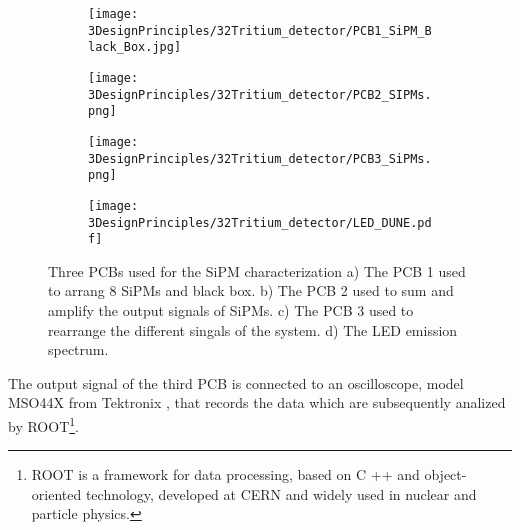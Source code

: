 \begin{figure}
\centering
    \begin{subfigure}[b]{0.5\textwidth}
    \centering
    \texttt{[image: 3DesignPrinciples/32Tritium\_detector/PCB1\_SiPM\_Black\_Box.jpg]}  
    \caption{\label{subfig:PCB1}}
    \end{subfigure}
    \hfill
    \begin{subfigure}[b]{0.45\textwidth}
    \centering
    \texttt{[image: 3DesignPrinciples/32Tritium\_detector/PCB2\_SIPMs.png]}  
    \caption{\label{subfig:PCB2}}
    \end{subfigure}
    \hfill
    \begin{subfigure}[b]{0.4\textwidth}
    \centering
    \texttt{[image: 3DesignPrinciples/32Tritium\_detector/PCB3\_SiPMs.png]}  
    \caption{\label{subfig:PCB3}}
    \end{subfigure}
    \hfill
    \begin{subfigure}[b]{0.5\textwidth}
    \centering
    \texttt{[image: 3DesignPrinciples/32Tritium\_detector/LED\_DUNE.pdf]}  
    \caption{\label{subfig:LEDSpectrum}}
    \end{subfigure}
 \caption{Three PCBs used for the SiPM characterization a) The PCB 1 used to arrang 8 SiPMs and black box. b) The PCB 2 used to sum and amplify the output signals of SiPMs. c) The PCB 3 used to rearrange the different singals of the system. d) The LED emission spectrum.}
 \label{fig:PCBs_LEDSpectrum}
\end{figure}

The output signal of the third PCB is connected to an oscilloscope, model MSO44X from Tektronix \cite{Oscilloscope}, that records the data which are subsequently analized by ROOT\footnote{ROOT is a framework for data processing, based on C ++ and object-oriented technology, developed at CERN and widely used in nuclear and particle physics.}.